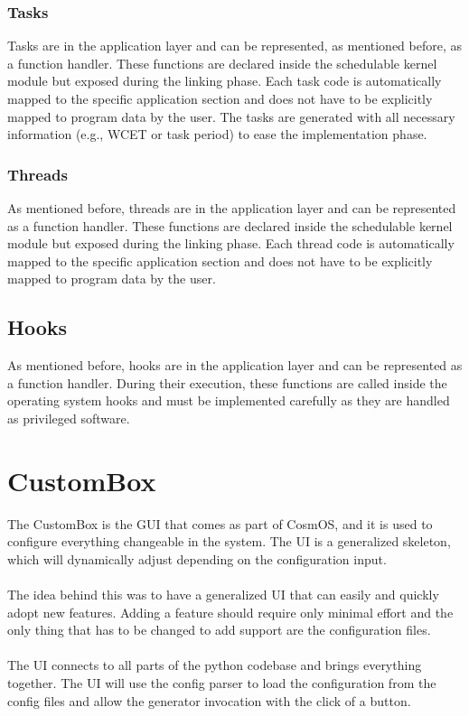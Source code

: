 \subsubsection{Tasks}
Tasks are in the application layer and can be represented, as mentioned before, as a function handler. These functions are declared inside the schedulable kernel module but exposed during the linking phase. Each task code is automatically mapped to the specific application section and does not have to be explicitly mapped to program data by the user. The tasks are generated with all necessary information (e.g., \ac{WCET} or task period) to ease the implementation phase.
\subsubsection{Threads}
As mentioned before, threads are in the application layer and can be represented as a function handler. These functions are declared inside the schedulable kernel module but exposed during the linking phase. Each thread code is automatically mapped to the specific application section and does not have to be explicitly mapped to program data by the user.
\subsection{Hooks}
As mentioned before, hooks are in the application layer and can be represented as a function handler. During their execution, these functions are called inside the operating system hooks and must be implemented carefully as they are handled as privileged software.
\section{CustomBox}
The CustomBox is the \ac{GUI} that comes as part of CosmOS, and it is used to configure everything changeable in the system. The \ac{UI} is a generalized skeleton, which will dynamically adjust depending on the configuration input.
\paragraph*{} The idea behind this was to have a generalized \ac{UI} that can easily and quickly adopt new features. Adding a feature should require only minimal effort and the only thing that has to be changed to add support are the configuration files.
\paragraph*{} The \ac{UI} connects to all parts of the python codebase and brings everything together. The \ac{UI} will use the config parser to load the configuration from the config files and allow the generator invocation with the click of a button.
